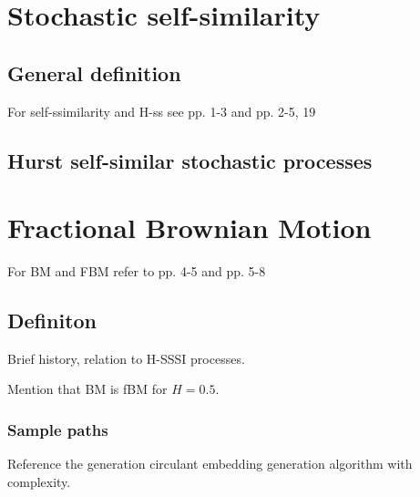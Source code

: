 \documentclass[a4paper]{report}
\begin{document}


\section{Stochastic self-similarity} %
\label{sec:stochastic_self_similarity}

\subsection{General definition} %
\label{sub:general_definition}

For self-ssimilarity and H-ss see \cite{embrechtsselfsimilar} pp. 1-3 and \cite{embrechts2000introduction} pp. 2-5, 19


\subsection{Hurst self-similar stochastic processes} %
\label{sub:hurst_self_similar_stochastic_processes}



\section{Fractional Brownian Motion} %
\label{sec:fractional_brownian_motion}

For BM and FBM refer to \cite{embrechtsselfsimilar} pp. 4-5 and \cite{embrechts2000introduction} pp. 5-8

\subsection{Definiton} %
\label{sub:definiton}
Brief history, relation to H-SSSI processes.

Mention that BM is fBM for $H=0.5$.

\subsubsection{Sample paths} %
\label{ssub:sample_paths}

Reference the generation circulant embedding generation algorithm with complexity.
\end{document}
